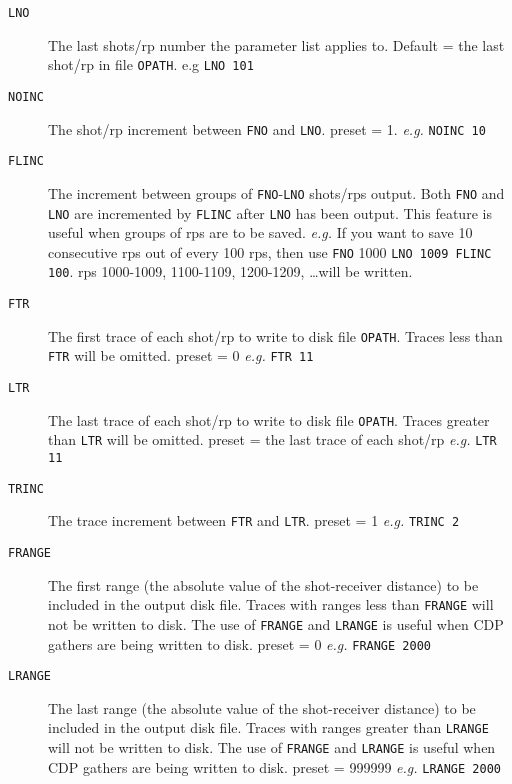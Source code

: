 \begin{description}
\item[\texttt{LNO}]   The last \glspl{shot}/\gls{rp} number the parameter list applies to.  Default = the last \gls{shot}/\gls{rp} in file \texttt{OPATH}.    e.g \texttt{LNO 101}

\item[\texttt{NOINC}] The \gls{shot}/\gls{rp} increment between \texttt{FNO} and \texttt{LNO}.  \Gls{preset} = 1.    \textit{e.g.} \texttt{NOINC 10}

\item[\texttt{FLINC}] The increment between groups of \texttt{FNO}-\texttt{LNO} \glspl{shot}/\glspl{rp} output.  Both \texttt{FNO} and \texttt{LNO} are incremented by \texttt{FLINC} after \texttt{LNO} has been output.  This feature is useful when groups of \glspl{rp} are to be saved.  \textit{e.g.}  If you want to save 10 consecutive \glspl{rp} out of every 100 \glspl{rp}, then use       \texttt{FNO} 1000 \texttt{LNO 1009 FLINC 100}.  \glspl{rp} 1000-1009, 1100-1109, 1200-1209, \ldots   will be written.

\item[\texttt{FTR}]   The first trace of each \gls{shot}/\gls{rp} to write to disk file \texttt{OPATH}.  Traces less than \texttt{FTR} will be omitted.  \Gls{preset} = 0     \textit{e.g.}  \texttt{FTR  11}

\item[\texttt{LTR}]   The last trace of each \gls{shot}/\gls{rp} to write to disk file \texttt{OPATH}.  Traces greater than \texttt{LTR} will be omitted.  \Gls{preset} = the last trace of each \gls{shot}/\gls{rp} \textit{e.g.}  \texttt{LTR 11}

\item[\texttt{TRINC}] The trace increment between \texttt{FTR} and \texttt{LTR}.  \Gls{preset} = 1     \textit{e.g.} \texttt{TRINC 2}

\item[\texttt{FRANGE}]  The first range (the absolute value of the shot-receiver distance) to be included in the output disk file.  Traces with ranges less than \texttt{FRANGE} will not be written to disk.  The use of \texttt{FRANGE} and \texttt{LRANGE} is useful when CDP \glspl{gather} are being written to disk.  \Gls{preset} = 0     \textit{e.g.} \texttt{FRANGE 2000}

\item[\texttt{LRANGE}]  The last range (the absolute value of the shot-receiver distance) to be included in the output disk file.  Traces with ranges greater than \texttt{LRANGE} will not be written to disk. The use of \texttt{FRANGE} and \texttt{LRANGE} is useful when CDP \glspl{gather} are being written to disk.  \Gls{preset} = 999999     \textit{e.g.} \texttt{LRANGE 2000}


\end{description}
